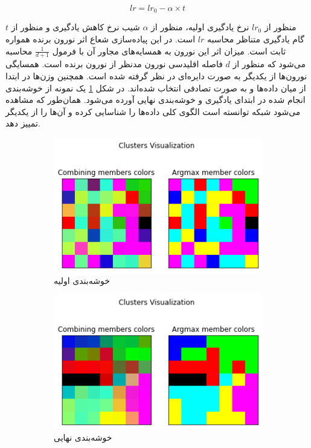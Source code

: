 \documentclass[12pt, a4paper]{article}
\begin{document}
$$lr = lr_0 - \alpha \times t$$

منظور از $lr_0$ نرخ یادگیری اولیه، منظور از $\alpha$ شیب نرخ کاهش یادگیری و
منظور از $t$ گام یادگیری متناظر محاسبه $lr$ است. در این پیاده‌سازی شعاع اثر نورون‌ برنده
همواره ثابت است. میزان اثر این نورون به همسایه‌های مجاور آن با فرمول $\frac{1}{d+1}$ محاسبه می‌شود که منظور از $d$
فاصله اقلیدسی نورون مدنظر از نورون برنده است. همسایگی نورون‌ها از یکدیگر به صورت دایره‌ای در نظر گرفته شده است.
همچنین وزن‌ها در ابتدا از میان داده‌ها و به صورت تصادفی انتخاب شده‌اند. در شکل \ref{som_performance}
یک نمونه از خوشه‌بندی انجام شده در ابتدای یادگیری و خوشه‌بندی نهایی آورده می‌شود. همان‌طور که مشاهده می‌شود
شبکه  توانسته‌ است الگوی کلی داده‌ها را شناسایی کرده و آن‌ها را از یکدیگر تمییز دهد.

\begin{figure}[h]
    \centering
    \begin{subfigure}{0.8\linewidth}
        \centering
        \includegraphics[width=0.8\linewidth]{images/som_example/initial.png}
        \caption{خوشه‌بندی اولیه}
    \end{subfigure}
    \begin{subfigure}{0.8\linewidth}
        \centering
        \includegraphics[width=0.8\linewidth]{images/som_example/final.png}
        \caption{خوشه‌بندی نهایی}
    \end{subfigure}
    \caption{}
    \label{som_performance}
\end{figure}
\end{document}
